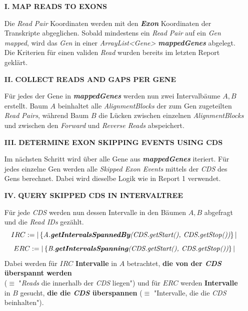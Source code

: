 \documentclass[12pt]{article}
\begin{document}
\begin{itemize}
    \item[\textbf{I.}] \textbf{MAP READS TO EXONS}

        Die \textit{Read Pair} Koordinaten werden mit den \textit{\textbf{Exon}} Koordinaten der Transkripte abgeglichen. 
        Sobald mindestens ein \textit{Read Pair} auf ein \textit{Gen} \textit{mapped}, wird das \textit{Gen}
        in einer \textit{ArrayList<Gene> \textbf{mappedGenes}} abgelegt.
        Die Kriterien für einen validen \textit{Read} wurden bereits im letzten Report geklärt. 

    \item[\textbf{II.}] \textbf{COLLECT READS AND GAPS PER GENE}

        Für jedes der Gene in \textbf{\textit{mappedGenes}} werden nun zwei Intervalbäume $A, B$ erstellt.
        Baum $A$ beinhaltet alle \textit{AlignmentBlocks} der zum Gen zugeteilten \textit{Read Pairs},
        während Baum $B$ die Lücken zwischen einzelnen \textit{AlignmentBlocks} und zwischen
        den \textit{Forward} und \textit{Reverse Reads} abspeichert.

    \item[\textbf{III.}] \textbf{DETERMINE EXON SKIPPING EVENTS USING CDS}

        Im nächsten Schritt wird über alle Gene aus \textbf{\textit{mappedGenes}} iteriert.
        Für jedes einzelne Gen werden alle \textit{Skipped Exon Events} mittels der
        \textit{CDS} des Gens berechnet. Dabei wird dieselbe Logik wie in 
        Report 1 verwendet.

    \item[\textbf{IV.}] \textbf{QUERY SKIPPED CDS IN INTERVALTREE}

        Für jede \textit{CDS} werden nun dessen Intervalle in den Bäumen $A, B$ abgefragt und die
        \textit{Read IDs} gezählt.
        \[
        IRC := |\left\{\textit{A.\textbf{getIntervalsSpannedBy}(CDS.getStart(), CDS.getStop())}\right\}|
        \]
        \[
        ERC := |\left\{\textit{B.\textbf{getIntervalsSpanning}(CDS.getStart(), CDS.getStop())}\right\}|
        \]
        Dabei werden für $IRC$ \textbf{Intervalle} in $A$ betrachtet, \textbf{die von der \textit{CDS} überspannt werden} \\
        ($\equiv$ "\textit{Reads} die innerhalb der \textit{CDS} liegen") und für 
        $ERC$ werden \textbf{Intervalle} in $B$ gesucht, \textbf{die die \textit{CDS} überspannen} 
        ($\equiv$ "Intervalle, die die \textit{CDS} beinhalten").
\end{itemize}
\newpage
\end{document}
